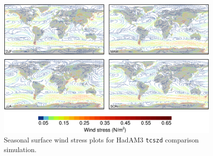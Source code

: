 \documentclass[a4paper,11pt]{article}
\begin{document}
\begin{figure}
  \begin{center}
    \includegraphics[width=\textwidth]{../hadam3-comparison/plots/stress-plots}
  \end{center}
  \caption{Seasonal surface wind stress plots for HadAM3
    \texttt{tcszd} comparison simulation.}
  \label{fig:stress-hadam3}
\end{figure}
\end{document}
